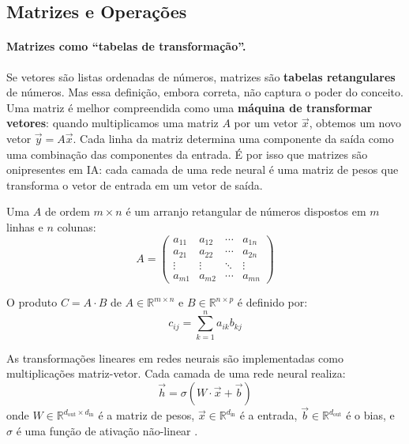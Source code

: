 \subsection{Matrizes e Operações}

\paragraph{Matrizes como ``tabelas de transformação''.} Se vetores são
listas ordenadas de números, matrizes são \textbf{tabelas retangulares} de
números. Mas essa definição, embora correta, não captura o poder do conceito.
Uma matriz é melhor compreendida como uma \textbf{máquina de transformar
vetores}: quando multiplicamos uma matriz $A$ por um vetor $\vec{x}$, obtemos
um novo vetor $\vec{y} = A\vec{x}$. Cada linha da matriz determina uma
componente da saída como uma combinação das componentes da entrada. É por
isso que matrizes são onipresentes em IA: cada camada de uma rede neural é
uma matriz de pesos que transforma o vetor de entrada em um vetor de saída.

\begin{definicao}[Matriz]
    Uma  $A$ de ordem $m \times n$ é um arranjo retangular
    de números dispostos em $m$ linhas e $n$ colunas:
    \[
    A = \begin{pmatrix}
        a_{11} & a_{12} & \cdots & a_{1n} \\
        a_{21} & a_{22} & \cdots & a_{2n} \\
        \vdots & \vdots & \ddots & \vdots \\
        a_{m1} & a_{m2} & \cdots & a_{mn}
    \end{pmatrix}
    \]
\end{definicao}

\begin{definicao}
    O produto $C = A \cdot B$ de $A \in \mathbb{R}^{m \times n}$ e
    $B \in \mathbb{R}^{n \times p}$ é definido por:
    \[
    c_{ij} = \sum_{k=1}^{n} a_{ik} b_{kj}
    \]
\end{definicao}

\begin{exemplo}
    As transformações lineares em redes neurais são implementadas como
    multiplicações matriz-vetor. Cada camada de uma rede neural realiza:
    \[
    \vec{h} = \sigma(W \cdot \vec{x} + \vec{b})
    \]
    onde $W \in \mathbb{R}^{d_{\text{out}} \times d_{\text{in}}}$ é a matriz
    de pesos, $\vec{x} \in \mathbb{R}^{d_{\text{in}}}$ é a entrada,
    $\vec{b} \in \mathbb{R}^{d_{\text{out}}}$ é o bias, e $\sigma$ é uma
    função de ativação não-linear \cite{goodfellow2016deep}.
\end{exemplo}

